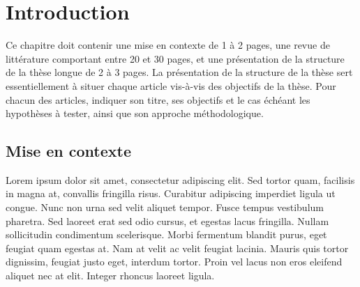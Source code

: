 \chapter{Introduction}
Ce chapitre doit contenir une mise en contexte de 1 à 2 pages, une revue de littérature comportant entre 20 et 30 pages, et une présentation de la structure de la thèse longue de 2 à 3 pages. La présentation de la structure de la thèse sert essentiellement à situer chaque article vis-à-vis des objectifs de la thèse. Pour chacun des articles, indiquer son titre, ses objectifs et le cas échéant les hypothèses à tester, ainsi que son approche méthodologique.

\section{Mise en contexte}
Lorem ipsum dolor sit amet, consectetur adipiscing elit. Sed tortor quam, facilisis in magna at, convallis fringilla risus. Curabitur adipiscing imperdiet ligula ut congue. Nunc non urna sed velit aliquet tempor. Fusce tempus vestibulum pharetra. Sed laoreet erat sed odio cursus, et egestas lacus fringilla. Nullam sollicitudin condimentum scelerisque. Morbi fermentum blandit purus, eget feugiat quam egestas at. Nam at velit ac velit feugiat lacinia. Mauris quis tortor dignissim, feugiat justo eget, interdum tortor. Proin vel lacus non eros eleifend aliquet nec at elit. Integer rhoncus laoreet ligula.


